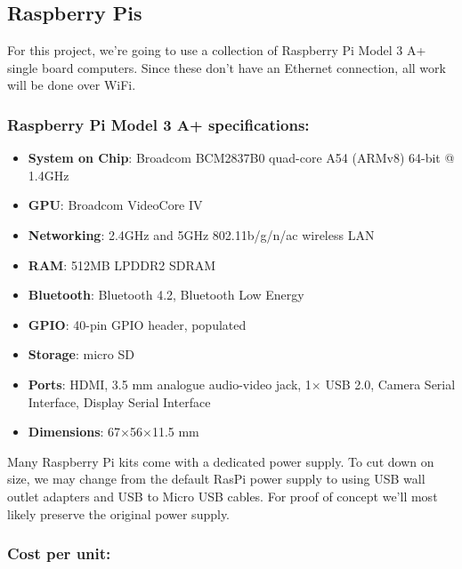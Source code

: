 \documentclass{report}
\begin{document}
\subsection{Raspberry Pis}

For this project, we're going to use a collection of Raspberry Pi Model 3 A+ single board computers. Since these don't have an Ethernet connection, all work will be done over WiFi. 

\subsubsection{Raspberry Pi Model 3 A+ specifications:}

\begin{itemize}
\item {\bf System on Chip}: Broadcom BCM2837B0 quad-core A54 (ARMv8) 64-bit @ 1.4GHz
\item {\bf GPU}: Broadcom VideoCore IV
\item {\bf Networking}: 2.4GHz and 5GHz 802.11b/g/n/ac wireless LAN
\item {\bf RAM}: 512MB LPDDR2 SDRAM
\item {\bf Bluetooth}: Bluetooth 4.2, Bluetooth Low Energy
\item {\bf GPIO}: 40-pin GPIO header, populated
\item {\bf Storage}: micro SD
\item {\bf Ports}: HDMI, 3.5 mm analogue audio-video jack, 1$\times$ USB 2.0, Camera Serial Interface, Display Serial Interface \
\item {\bf Dimensions}: 67$\times$56$\times$11.5 mm
\end{itemize}

Many Raspberry Pi kits come with a dedicated power supply. To cut down on size, we may change from the default RasPi power supply to using USB wall outlet adapters and USB to Micro USB cables. For proof of concept we'll most likely preserve the original power supply. 

\subsubsection{Cost per unit:}
\end{document}
